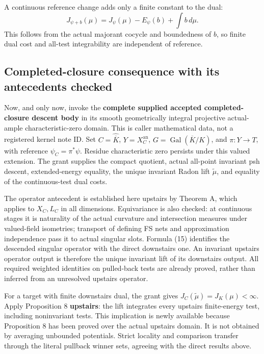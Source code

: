 \documentclass[
]{article}
\begin{document}
A continuous reference change adds only a finite constant to the dual:
\[
J_{\psi+b}(\mu)=J_\psi(\mu)-E_\psi(b)+\int b\,d\mu.
\tag{25}
\] This follows from the actual majorant cocycle and boundedness of
\(b\), so finite dual cost and all-test integrability are independent of
reference.

\subsection{Completed-closure consequence with its antecedents
checked}\label{completed-closure-consequence-with-its-antecedents-checked}

Now, and only now, invoke the \textbf{complete supplied accepted
completed-closure descent body} in its smooth geometrically integral
projective actual-ample characteristic-zero domain. This is caller
mathematical data, not a registered kernel note ID. Set
\(C=\widehat{\overline K}\), \(Y=X_C^{\mathrm{an}}\),
\(G=\operatorname{Gal}(\overline K/K)\), and \(\pi:Y\to T\), with
reference \(\psi_C=\pi^*\psi\). Residue characteristic zero persists
under this valued extension. The grant supplies the compact quotient,
actual all-point invariant psh descent, extended-energy equality, the
unique invariant Radon lift \(\widetilde\mu\), and equality of the
continuous-test dual costs.

The operator antecedent is established here upstairs by Theorem A, which
applies to \(X_C,L_C\) in all dimensions. Equivariance is also checked:
at continuous stages it is naturality of the actual curvature and
intersection measures under valued-field isometries; transport of
defining FS nets and approximation independence pass it to actual
singular slots. Formula (15) identifies the descended singular operator
with the direct downstairs one. An invariant upstairs operator output is
therefore the unique invariant lift of its downstairs output. All
required weighted identities on pulled-back tests are already proved,
rather than inferred from an unresolved upstairs operator.

For a target with finite downstairs dual, the grant gives
\(J_C(\widetilde\mu)=J_K(\mu)<\infty\). Apply Proposition 8
\textbf{upstairs}: the lift integrates every upstairs finite-energy
test, including noninvariant tests. This implication is newly available
because Proposition 8 has been proved over the actual upstairs domain.
It is not obtained by averaging unbounded potentials. Strict locality
and comparison transfer through the literal pullback winner sets,
agreeing with the direct results above.
\end{document}
